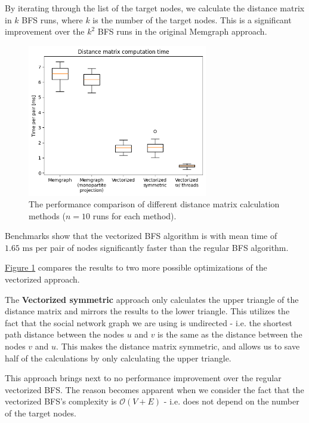 By iterating through the list of the target nodes, we calculate the distance matrix in $k$ BFS runs, where $k$ is the number of the target nodes.
This is a significant improvement over the $k^2$ BFS runs in the original Memgraph approach.

\begin{figure}[ht!]
    \captionsetup{width=.9\linewidth}
    \includegraphics[width=0.7\textwidth]{../img/identity_inferrence_distance_matrix.png}
    \centering
    \caption{The performance comparison of different distance matrix calculation methods ($n = 10$ runs for each method).}
    \label{fig:identity-inferrence-benchmarks}
\end{figure}

Benchmarks show that the vectorized BFS algorithm is with mean time of $1.65\text{ ms}$ per pair of nodes significantly faster than the regular BFS algorithm.

\hyperref[fig:identity-inferrence-benchmarks]{Figure \ref*{fig:identity-inferrence-benchmarks}} compares the results to two more possible optimizations of the vectorized approach.

The \textbf{Vectorized symmetric} approach only calculates the upper triangle of the distance matrix and mirrors the results to the lower triangle.
This utilizes the fact that the social network graph we are using is undirected - i.e. the shortest path distance between the nodes $u$ and $v$ is the same as the distance between the nodes $v$ and $u$.
This makes the distance matrix symmetric, and allows us to save half of the calculations by only calculating the upper triangle.

This approach brings next to no performance improvement over the regular vectorized BFS.
The reason becomes apparent when we consider the fact that the vectorized BFS's complexity is $\mathcal{O}(V + E)$ - i.e. does not depend on the number of the target nodes.

